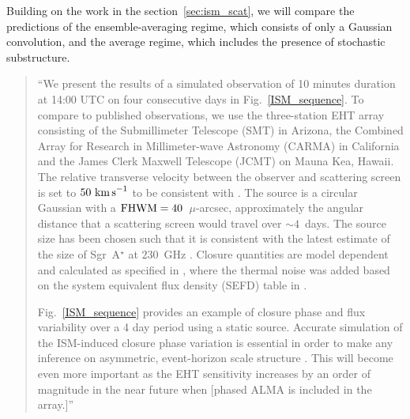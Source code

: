 Building on the work in the section~\ref{sec:ism_scat}, we will compare the predictions of the ensemble-averaging regime, which consists of only a Gaussian convolution, and the average regime, which includes the presence of stochastic substructure. 
\begin{quotation}  
``We present the results of a simulated observation of 10 minutes duration at 14:00 UTC on four consecutive days in Fig.~\ref{ISM_sequence}. To compare to published observations, we use the three-station EHT array consisting of the Submillimeter Telescope (SMT) in Arizona, the Combined Array for Research in Millimeter-wave Astronomy (CARMA) in California and the James Clerk Maxwell Telescope (JCMT) on Mauna Kea, Hawaii. The relative transverse velocity between the observer and scattering screen is set to $50~\rm{km\,s}^{-1}$ to be consistent with \citet{Ortiz_2016}. The source is a circular Gaussian with a $\rm{FHWM}=40$~$\mu$-arcsec, approximately the angular distance that a scattering screen would travel over $\sim 4$~days. The source size has been chosen such that it is consistent with the latest estimate of the size of Sgr~A$^\star$ at $230$~GHz \citep{Fish_2011}.  Closure quantities are model dependent and calculated as specified in \citet{Rogers_1995}, where the thermal noise was added based on the system equivalent flux density (SEFD) table in \citep{Lu_2014}.


Fig.~\ref{ISM_sequence} provides an example of closure phase and flux variability over a 4 day period using a static source. Accurate simulation of the ISM-induced closure phase variation is essential in order to make any inference on asymmetric, event-horizon scale structure \citep[e.g.][]{Fish_2016,Ortiz_2016}. This will become even more important as the EHT sensitivity increases by an order of magnitude in the near future when [phased ALMA is included in the array.]''
\citep{Blecher_2016} 
\end{quotation}


